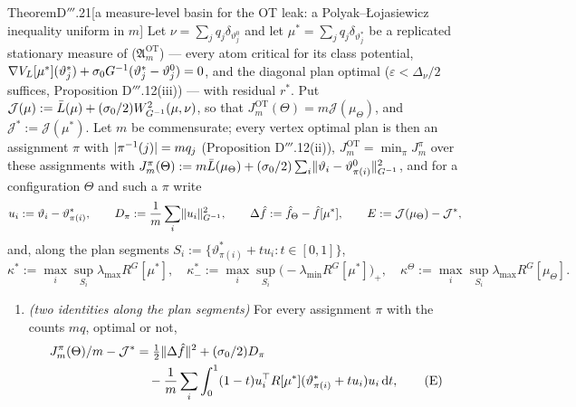 \begin{thm}{Theorem}{D$'''$.21}[a measure-level basin for the OT leak: a Polyak--{\L}ojasiewicz inequality uniform
in $m$]\label{res:thmDppp:21}%
Let $\nu = \sum_jq_j\delta_{\vartheta^0_j}$ and let $\mu^* = \sum_jq_j\delta_{\vartheta^*_j}$ be a replicated
stationary measure of \textup{($\mathfrak{A}_m^{\mathrm{OT}}$)} --- every atom critical for its class potential,
$\nabla V_L[\mu^*](\vartheta^*_j) + \sigma_0G^{-1}(\vartheta^*_j - \vartheta^0_j) = 0$, and the diagonal plan optimal
($\varepsilon < \Delta_\nu/2$ suffices, Proposition D$'''$.12(iii)) --- with residual $r^*$. Put
$\mathcal{J}(\mu) := \bar L(\mu) + (\sigma_0/2)W^2_{G^{-1}}(\mu,\nu)$, so that
$J_m^{\mathrm{OT}}(\Theta) = m\mathcal{J}(\mu_\Theta)$, and $\mathcal{J}^* := \mathcal{J}(\mu^*)$. Let $m$ be
commensurate; every vertex optimal plan is then an assignment $\pi$ with $\lvert \pi^{-1}(j)\rvert = mq_j$ (Proposition
D$'''$.12(ii)), $J_m^{\mathrm{OT}} = \min_\pi J^\pi_m$ over these assignments with
$J^\pi_m(\Theta) := m\bar L(\mu_\Theta) + (\sigma_0/2)\sum_i\lVert \vartheta_i - \vartheta^0_{\pi(i)}\rVert^2_{G^{-1}}$, and
for a configuration $\Theta$ and such a $\pi$ write
\[
  u_i := \vartheta_i - \vartheta^*_{\pi(i)},\qquad D_\pi := \frac1m\sum_i\lVert u_i\rVert^2_{G^{-1}},\qquad
  \Delta\hat f := \hat f_\Theta - \hat f[\mu^*],\qquad E := \mathcal{J}(\mu_\Theta) - \mathcal{J}^*,
\]
and, along the plan segments $S_i := \{\vartheta^*_{\pi(i)} + tu_i : t\in[0,1]\}$,
\[
  \kappa^* := \max_i\sup_{S_i}\lambda_{\max}R^G[\mu^*],\quad
  \kappa^*_- := \max_i\sup_{S_i}\bigl(-\lambda_{\min}R^G[\mu^*]\bigr)_+,\quad
  \kappa^\Theta := \max_i\sup_{S_i}\lambda_{\max}R^G[\mu_\Theta].
\]
\begin{enumerate}[label=\textup{(\roman*)}]
  \item \emph{(two identities along the plan segments)} For every assignment $\pi$ with the counts $mq$, optimal or
    not,
    \begin{align}
      J^\pi_m(\Theta)/m - \mathcal{J}^* &= \tfrac12\norm{\Delta\fhat}^2 + (\sigma_0/2)D_\pi
      \notag\\
      &\quad- \frac1m\sum_i\int_0^1(1 - t)u_i^\T R[\mu^*](\vartheta^*_{\pi(i)} + tu_i)u_i\dd t,
      \tag{E}\\

\end{align}
\end{enumerate}
\end{thm}
